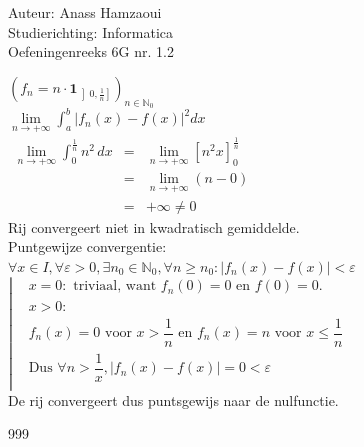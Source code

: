 \documentclass[a4paper]{article}
\newcommand{\dint}{\displaystyle\int}
\begin{document}
\noindent \large Auteur: Anass Hamzaoui \\
\noindent \large Studierichting: Informatica \\
\noindent \large Oefeningenreeks 6G nr. 1.2 \\
\medskip
\normalsize

$\left(f_n = n \cdot \textbf{1}_{\left]0,\tfrac{1}{n}\right]}\right)_{n \in \mathbb{N}_0}$ \\

$\lim\limits_{n \rightarrow +\infty} \dint_{a}^{b} |f_n(x) - f(x)|^2 dx$ \\

$\begin{array}{lll}
    \lim\limits_{n \rightarrow +\infty} \dint_{0}^{\tfrac{1}{n}} n^2 \, dx
    &=& \lim\limits_{n \rightarrow +\infty} \left[n^2 x\right]_{0}^{\tfrac{1}{n}} \\
    &=& \lim\limits_{n \rightarrow +\infty} \left(n - 0\right) \\
    &=& +\infty \neq 0
\end{array}$ \\

Rij convergeert niet in kwadratisch gemiddelde. \\

Puntgewijze convergentie: \\

$\forall x \in I, \forall \varepsilon > 0, \exists n_0 \in \mathbb{N}_0, \forall n \geq n_0 : \left|f_n(x) - f(x)\right| < \varepsilon$ \\

$\left|\begin{array}{ll}
    & x = 0: \text{ triviaal, want } f_n(0) = 0 \text{ en } f(0) = 0. \\
    & x > 0: \\
    & f_n(x) = 0 \text{ voor } x > \dfrac{1}{n} \text{ en } f_n(x) = n \text{ voor } x \leq \dfrac{1}{n} \\
    & \text{Dus } \forall n > \dfrac{1}{x}, \left|f_n(x) - f(x)\right| = 0 < \varepsilon \\
\end{array}\right.$ \\

De rij convergeert dus puntsgewijs naar de nulfunctie.

\begin{thebibliography}{999}
\end{thebibliography}
\end{document}
